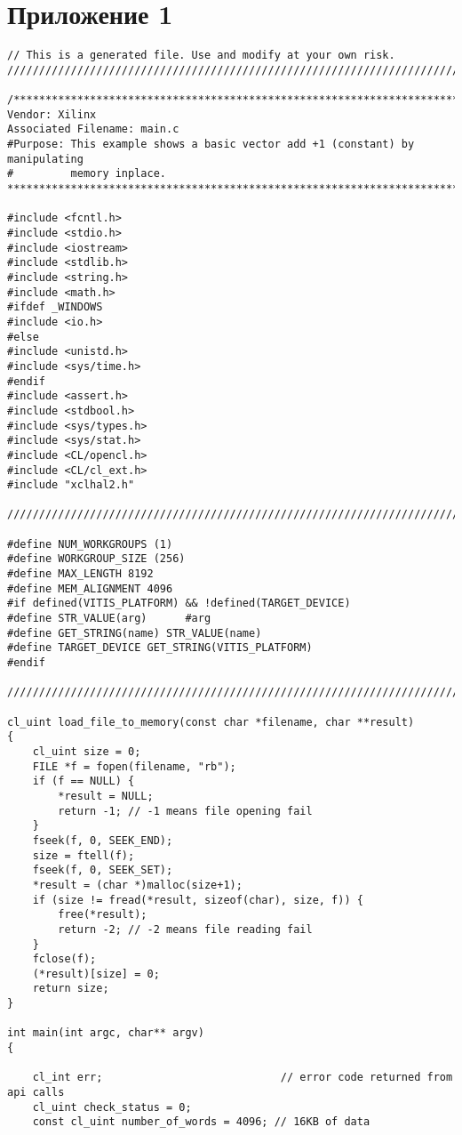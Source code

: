 \chapter*{Приложение 1}

\begin{lstlisting}[label=lst:lev_rec,caption=Содержимое файла host\_example.cpp]
// This is a generated file. Use and modify at your own risk.
////////////////////////////////////////////////////////////////////////////////

/*******************************************************************************
Vendor: Xilinx
Associated Filename: main.c
#Purpose: This example shows a basic vector add +1 (constant) by manipulating
#         memory inplace.
*******************************************************************************/

#include <fcntl.h>
#include <stdio.h>
#include <iostream>
#include <stdlib.h>
#include <string.h>
#include <math.h>
#ifdef _WINDOWS
#include <io.h>
#else
#include <unistd.h>
#include <sys/time.h>
#endif
#include <assert.h>
#include <stdbool.h>
#include <sys/types.h>
#include <sys/stat.h>
#include <CL/opencl.h>
#include <CL/cl_ext.h>
#include "xclhal2.h"

////////////////////////////////////////////////////////////////////////////////

#define NUM_WORKGROUPS (1)
#define WORKGROUP_SIZE (256)
#define MAX_LENGTH 8192
#define MEM_ALIGNMENT 4096
#if defined(VITIS_PLATFORM) && !defined(TARGET_DEVICE)
#define STR_VALUE(arg)      #arg
#define GET_STRING(name) STR_VALUE(name)
#define TARGET_DEVICE GET_STRING(VITIS_PLATFORM)
#endif

////////////////////////////////////////////////////////////////////////////////

cl_uint load_file_to_memory(const char *filename, char **result)
{
	cl_uint size = 0;
	FILE *f = fopen(filename, "rb");
	if (f == NULL) {
		*result = NULL;
		return -1; // -1 means file opening fail
	}
	fseek(f, 0, SEEK_END);
	size = ftell(f);
	fseek(f, 0, SEEK_SET);
	*result = (char *)malloc(size+1);
	if (size != fread(*result, sizeof(char), size, f)) {
		free(*result);
		return -2; // -2 means file reading fail
	}
	fclose(f);
	(*result)[size] = 0;
	return size;
}

int main(int argc, char** argv)
{
	
	cl_int err;                            // error code returned from api calls
	cl_uint check_status = 0;
	const cl_uint number_of_words = 4096; // 16KB of data
	

\end{lstlisting}
